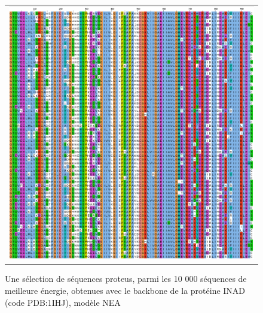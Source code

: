    \begin{figure}[t]
     \centering
     \begin{tabular}{c}
       \includegraphics[width=17cm]{proteus/1IHJ.png} \\
     \end{tabular}
       \caption{Une sélection de séquences proteus, parmi les 10 000 séquences de meilleure énergie, obtenues avec le backbone de la protéine INAD (code PDB:1IHJ), modèle NEA}
\label{align_proteus:INAD}
   \end{figure}
\clearpage

